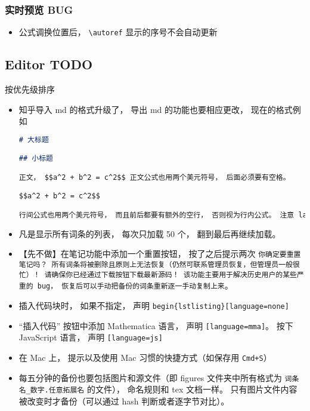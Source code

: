 \subsubsection{实时预览 BUG}
\begin{itemize}
\item 公式调换位置后， \verb|\autoref| 显示的序号不会自动更新
\end{itemize}

\subsection{Editor TODO}
按优先级排序
\begin{itemize}
\item 知乎导入 md 的格式升级了， 导出 md 的功能也要相应更改， 现在的格式例如
\begin{lstlisting}[language=markdown]
# 大标题

## 小标题

正文， $$a^2 + b^2 = c^2$$ 正文公式也用两个美元符号， 后面必须要有空格。

$$a^2 + b^2 = c^2$$

行间公式也用两个美元符号， 而且前后都要有额外的空行， 否则视为行内公式。 注意 latex 代码还是要使用 html 中的而不是 tex 中的。
\end{lstlisting}

\item 凡是显示所有词条的列表， 每次只加载 50 个， 翻到最后再继续加载。

\item 【先不做】在笔记功能中添加一个重置按钮， 按了之后提示两次 \verb|你确定要重置笔记吗？ 所有词条将被删除且原则上无法恢复（仍然可联系管理员恢复，但管理员一般很忙）！ 请确保你已经通过下载按钮下载最新源码！ 该功能主要用于解决历史用户的某些严重的 bug， 恢复后可以手动把备份的词条重新逐一手动复制上来|。

\item 插入代码块时， 如果不指定， 声明 \verb`begin{lstlisting}[language=none]`

\item “插入代码” 按钮中添加 Mathematica 语言， 声明 \verb`[language=mma]`。 按下 JavaScript 语言， 声明 \verb|[language=js]|

\item 在 Mac 上， 提示以及使用 Mac 习惯的快捷方式（如保存用 \verb|Cmd+S|）

\item 每五分钟的备份也要包括图片和源文件（即 figures 文件夹中所有格式为 \verb|词条名_数字.任意拓展名| 的文件）， 命名规则和 tex 文档一样。 只有图片文件内容被改变时才备份（可以通过 hash 判断或者逐字节对比）。


\end{itemize}
